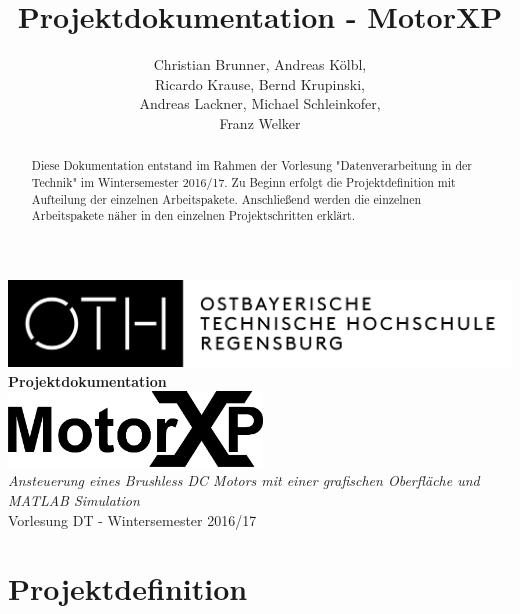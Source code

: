 \documentclass[a4paper,11pt]{report}
\title{Projektdokumentation - MotorXP}
\author{Christian Brunner, Andreas Kölbl, \\
  Ricardo Krause, Bernd Krupinski, \\
  Andreas Lackner, Michael Schleinkofer, \\
  Franz Welker}
\begin{document}
\makeatletter
\begin{titlepage}
  \centering
  \vspace*{0.02\textheight}
  \includegraphics[width=\textwidth]{images/OTHLogo}\vspace*{0.1\textheight}
  {\huge\textbf{\\Projektdokumentation\\}}\vspace*{0.05\textheight}
  \includegraphics[height=2cm]{images/MotorXP}\vspace*{0.05\textheight}
  {\large\textit{\\Ansteuerung eines Brushless DC Motors mit einer grafischen Oberfläche und MATLAB Simulation}}\vspace*{0.03\textheight}
  {\\Vorlesung DT - Wintersemester 2016/17\\}\vspace*{0.2\textheight}
  {\@author}
\end{titlepage}
\makeatother
\tableofcontents

\begin{abstract}
Diese Dokumentation entstand im Rahmen der Vorlesung "Datenverarbeitung in der Technik" im Wintersemester 2016/17. Zu Beginn erfolgt die
Projektdefinition mit Aufteilung der einzelnen Arbeitspakete. Anschließend werden die einzelnen Arbeitspakete näher in den einzelnen Projektschritten erklärt.
\end{abstract}

\chapter{Projektdefinition}

\listoffigures
\listoftables
\appendix


\end{document}
